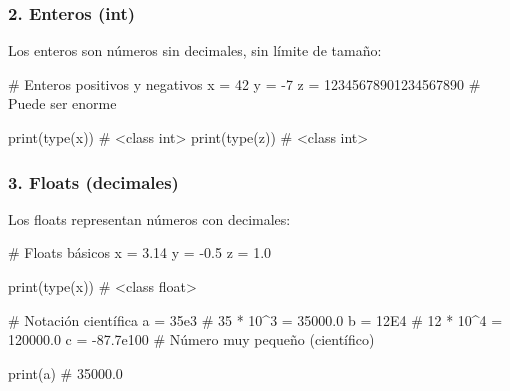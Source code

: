 \documentclass[
  doc,
  floatsintext,
  longtable,
  a4paper,
  nolmodern,
  notxfonts,
  notimes,
  12pt,
  colorlinks=true,linkcolor=blue,citecolor=blue,urlcolor=blue]{apa7}
\newenvironment{Shaded}{\begin{snugshade}}{\end{snugshade}}
\newcommand{\BuiltInTok}[1]{\textcolor[rgb]{0.00,0.23,0.31}{#1}}
\newcommand{\CommentTok}[1]{\textcolor[rgb]{0.37,0.37,0.37}{#1}}
\newcommand{\DecValTok}[1]{\textcolor[rgb]{0.68,0.00,0.00}{#1}}
\newcommand{\FloatTok}[1]{\textcolor[rgb]{0.68,0.00,0.00}{#1}}
\newcommand{\NormalTok}[1]{\textcolor[rgb]{0.00,0.23,0.31}{#1}}
\newcommand{\OperatorTok}[1]{\textcolor[rgb]{0.37,0.37,0.37}{#1}}
\begin{document}
\subsubsection{2. Enteros (int)}\label{enteros-int}

Los enteros son números sin decimales, sin límite de tamaño:

\begin{Shaded}
\begin{Highlighting}[]
\CommentTok{\# Enteros positivos y negativos}
\NormalTok{x }\OperatorTok{=} \DecValTok{42}
\NormalTok{y }\OperatorTok{=} \OperatorTok{{-}}\DecValTok{7}
\NormalTok{z }\OperatorTok{=} \DecValTok{12345678901234567890}  \CommentTok{\# Puede ser enorme}

\BuiltInTok{print}\NormalTok{(}\BuiltInTok{type}\NormalTok{(x))  }\CommentTok{\# \textless{}class \textquotesingle{}int\textquotesingle{}\textgreater{}}
\BuiltInTok{print}\NormalTok{(}\BuiltInTok{type}\NormalTok{(z))  }\CommentTok{\# \textless{}class \textquotesingle{}int\textquotesingle{}\textgreater{}}
\end{Highlighting}
\end{Shaded}

\subsubsection{3. Floats (decimales)}\label{floats-decimales}

Los floats representan números con decimales:

\begin{Shaded}
\begin{Highlighting}[]
\CommentTok{\# Floats básicos}
\NormalTok{x }\OperatorTok{=} \FloatTok{3.14}
\NormalTok{y }\OperatorTok{=} \OperatorTok{{-}}\FloatTok{0.5}
\NormalTok{z }\OperatorTok{=} \FloatTok{1.0}

\BuiltInTok{print}\NormalTok{(}\BuiltInTok{type}\NormalTok{(x))  }\CommentTok{\# \textless{}class \textquotesingle{}float\textquotesingle{}\textgreater{}}

\CommentTok{\# Notación científica}
\NormalTok{a }\OperatorTok{=} \FloatTok{35e3}   \CommentTok{\# 35 * 10\^{}3 = 35000.0}
\NormalTok{b }\OperatorTok{=} \FloatTok{12E4}   \CommentTok{\# 12 * 10\^{}4 = 120000.0}
\NormalTok{c }\OperatorTok{=} \OperatorTok{{-}}\FloatTok{87.7e100}  \CommentTok{\# Número muy pequeño (científico)}

\BuiltInTok{print}\NormalTok{(a)  }\CommentTok{\# 35000.0}
\end{Highlighting}
\end{Shaded}
\end{document}
